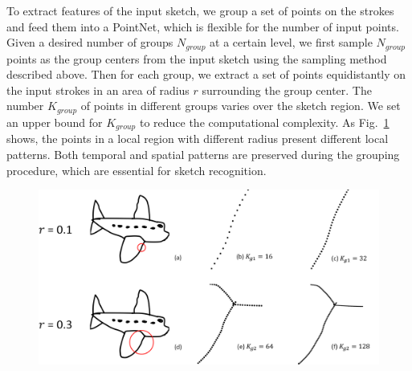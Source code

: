
To extract features of the input sketch, we group a set of points on the strokes and feed them into a PointNet, which is flexible for the number of input points.
%
Given a desired number of groups $N_{group}$ at a certain level, we first sample $N_{group}$ points as the group centers from the input sketch using the sampling method described above.
%
Then for each group, we extract a set of points equidistantly on the input strokes in an area of radius $r$ surrounding the group center.
%
The number $K_{group}$ of points in different groups varies over the sketch region. We set an upper bound for $K_{group}$ to reduce the computational complexity.
%
As Fig.~\ref{fig:group} shows, the points in a local region with different radius present different local patterns.
%
Both temporal and spatial patterns are preserved during the grouping procedure, which are essential for sketch recognition.
\\



\begin{figure}
	\centering
	\includegraphics[width=\columnwidth]{images/group.png}
	\label{fig:group}
\end{figure}

